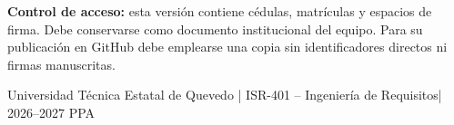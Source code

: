 \documentclass[11pt,a4paper]{article}
\newcommand{\Asignatura}{ISR-401 -- Ingeniería de Requisitos}
\newcommand{\Periodo}{2026--2027 PPA}
\begin{document}
\vspace{0.45cm}
{\small\color{RTGray}\textbf{Control de acceso:} esta versión contiene cédulas, matrículas y espacios de firma. Debe conservarse como documento institucional del equipo. Para su publicación en GitHub debe emplearse una copia sin identificadores directos ni firmas manuscritas.}

\vfill
\begin{center}
\small\color{RTGray}
Universidad Técnica Estatal de Quevedo | \Asignatura | \Periodo
\end{center}
\end{document}

